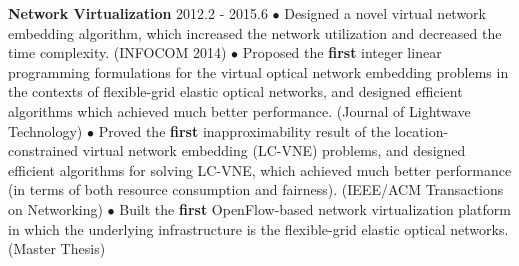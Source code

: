 \documentclass[line,11pt,letter]{/home/saber/GitHub/personal-resume/includes/cls/myRes}
\begin{document}
\begin{resume}
{}
{\setlength{\parskip}{0pt}
{\bf Network Virtualization} \hfill 2012.2 - 2015.6\break
{\hspace*{1em} $\bullet$ Designed a novel virtual network embedding algorithm, which increased the network utilization and decreased the time complexity. (INFOCOM 2014)\hfill\break}
{\hspace*{1em} $\bullet$ Proposed the {\bf first} integer linear programming formulations for the virtual optical network embedding problems in the contexts of flexible-grid elastic optical networks, and designed efficient algorithms which achieved much better performance. (Journal of Lightwave Technology)\hfill\break}
{\hspace*{1em} $\bullet$ Proved the {\bf first} inapproximability result of the location-constrained virtual network embedding (LC-VNE) problems, and designed efficient algorithms for solving LC-VNE, which achieved much better performance (in terms of both resource consumption and fairness). (IEEE/ACM Transactions on Networking)\hfill\break}
{\hspace*{1em} $\bullet$ Built the {\bf first} OpenFlow-based network virtualization platform in which the underlying infrastructure is the flexible-grid elastic optical networks. (Master Thesis)\hfill\break}
}
\negspace

\end{resume}
\end{document}
